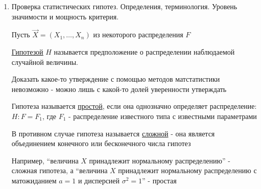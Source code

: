 \documentclass[12pt]{article}
\begin{document}
\begin{enumerate}
    Пусть $\chi_1^2$ и $\chi_2^2$ - квантили $H_{n}$ уровней $\frac{1 - \gamma}{2}$ и $\frac{1 + \gamma}{2}$

    Тогда $P\left(\chi_1^2 < \frac{n \tilde{\sigma^2}}{\sigma^2} < \chi_2^2\right) = F_{H_{n}}(\chi_1^2) - F_{H_{n}}(\chi_2^2) = \frac{1 - \gamma}{2} - \frac{1 + \gamma}{2} = \gamma$

    Аналогично получаем интервал $\left(\frac{n \tilde{\sigma^2}}{\chi_2^2}, \frac{n \tilde{\sigma^2}}{\chi_1^2}\right)$, 
    где $\chi_1^2$ и $\chi_2^2$ - квантили $H_{n}$ уровней $\frac{1 - \gamma}{2}$ и $\frac{1 + \gamma}{2}$, $n \tilde{\sigma^2} = \sum_{i = 1}^n (X_i - a)^2$

    \Nota $\tilde{\sigma^2} - D^* = \frac{1}{n} \sum_{i = 1}^n (X_i - a)^2 - \frac{1}{n} \sum_{i = 1}^n (X_i - \overline{x})^2 = 
    \frac{1}{n} \sum_{i = 1}^n (X_i^2 - 2aX_i + a^2 - X_i^2 + 2 \overline{x} X_i - \overline{x}^2) = 
    \frac{1}{n} (na^2 - 2a n \overline{x} + 2 \overline{x} \cdot n \overline{x} - n \overline{x}^2) = 
    a^2 - 2a \overline{x} + \overline{x}^2 = (a - \overline{x})^2 \Longrightarrow \tilde{\sigma^2} = D^* + (a - \overline{x})^2$

    Получаем $\left(\frac{n (D^* + (a - \overline{x})^2)}{\chi_2^2}, \frac{n (D^* + (a - \overline{x})^2)}{\chi_1^2}\right)$

    \item Проверка статистических гипотез. Определения, терминология. Уровень значимости и мощность критерия.

    Пусть $\vec X = (X_1, \dots, X_n)$ из некоторого распределения $F$

    \Def \underline{\hyperlink{hypothesis}{Гипотезой}} $H$ называется предположение о распределении наблюдаемой случайной величины. 

    Доказать какое-то утверждение с помощью методов матстатистики невозможно - можно лишь с какой-то долей 
    уверенности утверждать

    \Defs Гипотеза называется \underline{простой}, если она однозначно определяет распределение: 
    $H : F = F_1$, где $F_1$ - распределение известного типа с известными параметрами

    В противном случае гипотеза называется \underline{сложной} - она является объединением конечного или бесконечного числа
    гипотез

    Например, \enquote{величина $X$ принадлежит нормальному распределению} - сложная гипотеза, а 
    \enquote{величина $X$ принадлежит нормальному распределению с матожиданием $a = 1$ и дисперсией $\sigma^2 = 1$} - простая


\end{enumerate}
\end{document}
